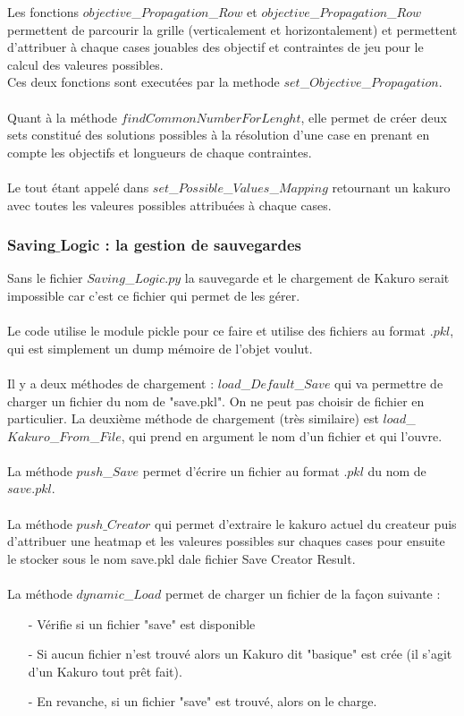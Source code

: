 \documentclass[french,12pt]{article}
\begin{document}
Les fonctions $objective$\_$Propagation$\_$Row$ et $objective$\_$Propagation$\_$Row$ permettent de parcourir la grille (verticalement et horizontalement) et permettent d'attribuer à chaque cases jouables des objectif et contraintes de jeu pour le calcul des valeures possibles. \\
Ces deux fonctions sont executées par la methode $set$\_$Objective$\_$Propagation$. \\ \\
Quant à la méthode $findCommonNumberForLenght$, elle permet de créer deux sets constitué des solutions possibles à la résolution d'une case en prenant en compte les objectifs et longueurs de chaque contraintes. \\ \\ Le tout étant appelé dans $set$\_$Possible$\_$Values$\_$Mapping$ retournant un kakuro avec toutes les valeures possibles attribuées à chaque cases. 

\subsubsection{Saving$\_$Logic : la gestion de sauvegardes}
Sans le fichier $Saving$\_$Logic.py$ la sauvegarde et le chargement de Kakuro serait impossible car c'est ce fichier qui permet de les gérer. \\ \\
Le code utilise le module pickle pour ce faire et utilise des fichiers au format $.pkl$, qui est simplement un dump mémoire de l'objet voulut.  \\ \\
Il y a deux méthodes de chargement : $load$\_$Default$\_$Save$ qui va permettre de charger un fichier du nom de "save.pkl". On ne peut pas choisir de fichier en particulier. La deuxième méthode de chargement (très similaire) est $load$\_$Kakuro$\_$From$\_$File$, qui prend en argument le nom d'un fichier et qui l'ouvre. \\ \\
La méthode $push$\_$Save$ permet d'écrire un fichier au format $.pkl$ du nom de $save.pkl$. \\ \\
La méthode $push\_Creator$ qui permet d'extraire le kakuro  actuel du createur puis d'attribuer une heatmap et les valeures possibles sur chaques cases pour ensuite le stocker sous le nom save.pkl dale fichier Save Creator Result. \\ \\ 
La méthode $dynamic$\_$Load$ permet de charger un fichier de la façon suivante : \\
\begin{enumerate}
\item[-] Vérifie si un fichier "save" est disponible\\
\item[-] Si aucun fichier n'est trouvé alors un Kakuro dit "basique" est crée (il s'agit d'un Kakuro tout prêt fait). \\
\item[-] En revanche, si un fichier "save" est trouvé, alors on le charge.\\
\end{enumerate}
\end{document}
